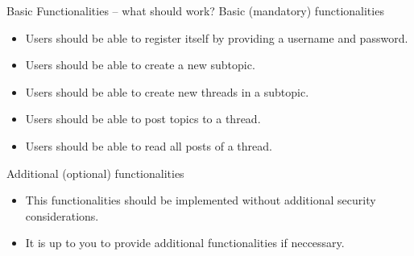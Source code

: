 ﻿\begin{frame}{Basic Functionalities -- what should work?}
  \alert{Basic (mandatory) functionalities}
  \begin{itemize}
    \item Users should be able to register itself by providing a username and password.
    \item Users should be able to create a new subtopic.
    \item Users should be able to create new threads in a subtopic.
    \item Users should be able to post topics to a thread.
    \item Users should be able to read all posts of a thread.
  \end{itemize}
  \alert{Additional (optional) functionalities}
  \begin{itemize}
    \item This functionalities should be implemented without additional security considerations.
    \item It is up to you to provide additional functionalities if neccessary.
  \end{itemize}
\end{frame}

